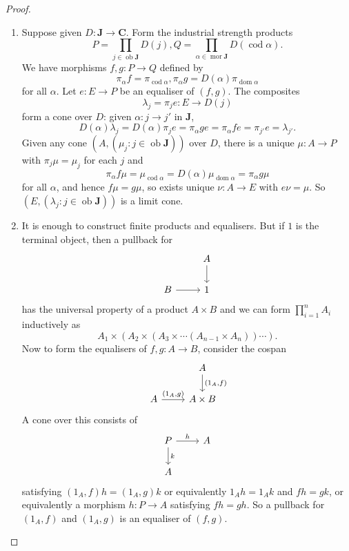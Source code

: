 \documentclass[a4paper]{article}
\renewcommand{\c}[1]{\mathbf{#1}}
\DeclareMathOperator{\ob}{ob}
\DeclareMathOperator{\mor}{mor}
\DeclareMathOperator{\dom}{dom}
\DeclareMathOperator{\cod}{cod}
\begin{document}
\begin{proof}\leavevmode
  \begin{enumerate}
  \item Suppose given \(D: \c J \to \c C\). Form the industrial strength products
    \[
      P = \prod_{j \in \ob \c J} D(j), Q = \prod_{\alpha \in \mor \c J} D(\cod \alpha).
    \]
    We have morphisms \(f, g: P \to Q\) defined by
    \[
      \pi_\alpha f = \pi_{\cod \alpha}, \pi_\alpha g = D(\alpha) \pi_{\dom \alpha}
    \]
    for all \(\alpha\). Let \(e: E \to P\) be an equaliser of \((f, g)\). The composites
    \[
      \lambda_j = \pi_j e: E \to D(j)
    \]
    form a cone over \(D\): given \(\alpha: j \to j'\) in \(\c J\),
    \[
      D(\alpha) \lambda_j = D(\alpha) \pi_j e = \pi_\alpha ge = \pi_\alpha fe = \pi_{j'} e = \lambda_{j'}.
    \]
    Given any cone \((A, (\mu_j: j \in \ob \c J))\) over \(D\), there is a unique \(\mu: A \to P\) with \(\pi_j \mu = \mu_j\) for each \(j\) and
    \[
      \pi_\alpha f \mu = \mu_{\cod \alpha} = D(\alpha) \mu_{\dom \alpha} = \pi_\alpha g \mu
    \]
    for all \(\alpha\), and hence \(f\mu = g\mu\), so exists unique \(\nu: A \to E\) with \(e\nu = \mu\). So \((E, (\lambda_j: j \in \ob \c J))\) is a limit cone.
  \item It is enough to construct finite products and equalisers. But if \(1\) is the terminal object, then a pullback for
    \[
      \begin{tikzcd}
        & A \ar[d] \\
        B \ar[r] & 1
      \end{tikzcd}
    \]
    has the universal property of a product \(A \times B\) and we can form \(\prod_{i = 1}^n A_i\) inductively as
    \[
      A_1 \times (A_2 \times (A_3 \times \cdots (A_{n - 1} \times A_n)) \cdots).
    \]
    Now to form the equalisers of \(f, g: A \to B\), consider the cospan
    \[
      \begin{tikzcd}
        & A \ar[d, "{(1_A, f)}"] \\
        A \ar[r, "{(1_A, g)}"] & A \times B
      \end{tikzcd}
    \]
    A cone over this consists of
    \[
      \begin{tikzcd}
      P \ar[r, "h"] \ar[,d, "k"] & A \\
      A
      \end{tikzcd}
    \]
    satisfying \((1_A, f) h = (1_A, g) k\) or equivalently \(1_A h = 1_Ak\) and \(fh = gk\), or equivalently a morphism \(h: P \to A\) satisfying \(fh = gh\). So a pullback for \((1_A, f)\) and \((1_A, g)\) is an equaliser of \((f, g)\).
  \end{enumerate}
\end{proof}
\end{document}
